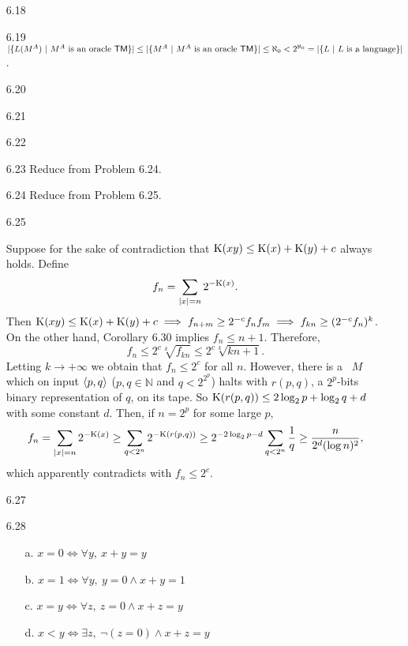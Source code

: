 \begin{itemize}
	\item[6.18]
	\Empty
	
	\item[6.19]
	$ |\{ L(M^A) \ | \ \text{$M^A$ is an oracle \TM} \}| \leq |\{ M^A \ | \ \text{$M^A$ is an oracle \TM} \}| \leq \aleph_0 < 2^{\aleph_0} = |\{ L \ | \ \text{$L$ is a language} \}|$.
	
	\item[6.20]
	\Empty
	
	\item[6.21]
	\Empty
	
	\item[6.22]
	\Empty
	
	\item[6.23]
	Reduce from Problem 6.24.
	
	\item[6.24]
	Reduce from Problem 6.25.
	
	\item[6.25]
	\Empty
	
	\item[\Star 6.26] 
	Suppose for the sake of contradiction that $\K(xy) \leq \K(x) + \K(y) + c$ always holds. Define
	$$
		f_n = \sum_{|x|=n} {2^{-\K(x)}}.
	$$
	Then $\K(xy) \leq \K(x) + \K(y) + c \implies f_{n+m} \geq 2^{-c} f_n f_m \implies f_{k n} \geq (2^{-c} f_n)^{k}$. On the other hand, Corollary 6.30 implies $f_n \leq n + 1$. Therefore, 
	$$
		f_n \leq 2^c \sqrt[k]{f_{k n}} \leq 2^c \sqrt[k]{kn + 1}.
	$$
	Letting $k \to +\infty$ we obtain that $f_n \leq 2^c$ for all $n$. However, there is a \TM\ $M$ which on input $\Bra{p, q}$ ($p, q \in \mathbb{N}$ and $q < 2^{2^p}$) halts with $r(p,q)$, a $2^p$-bits binary representation of $q$, on its tape. So $\K(r(p,q)) \leq 2 \log_2 p + \log_2 q + d$ with some constant $d$. Then, if $n = 2^p$ for some large $p$,
	$$
		f_{n} = \sum_{|x|=n} {2^{-\K(x)}} \geq \sum_{q < 2^n} {2^{-\K(r(p,q))}} \geq 2^{-2 \log_2 p - d} \sum_{q < 2^n} \frac{1}{q} \geq \frac{n}{2^d (\log n)^2},
	$$
	which apparently contradicts with $f_n \leq 2^c$.
	
	\item[6.27]
	\Empty
	
	\item[6.28]
	\begin{enumerate}
		\item[a.] $x = 0 \iff \forall y,\ x+y=y$
		\item[b.] $x = 1 \iff \forall y,\ y=0 \wedge x+y=1$ 
		\item[c.] $x = y \iff \forall z,\ z=0 \wedge x+z=y$
		\item[d.] $x < y \iff \exists z,\ \neg(z = 0) \wedge x + z = y$
	\end{enumerate}
	
\end{itemize}